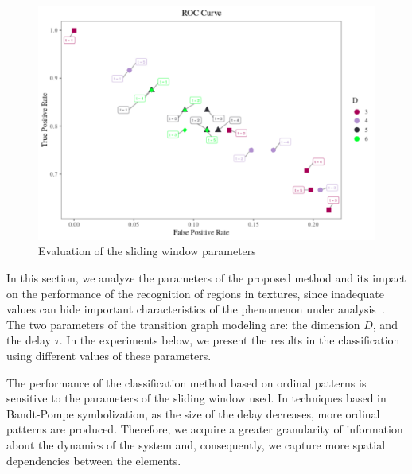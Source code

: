 \documentclass[journal]{IEEEtran}
\begin{document}
	\begin{figure}[h]
		\includegraphics[width=\columnwidth]{Figures/ROC.pdf}	\caption{Evaluation of the sliding window parameters}
		\label{fig:ROC}
	\end{figure} 
	
	In this section, we analyze the parameters of the proposed method and its impact on the performance of the recognition of regions in textures, since inadequate values can hide important characteristics of the phenomenon under analysis~\cite{mccullough2015time}.
	The two parameters of the transition graph modeling are: the dimension $D$, and the delay $\tau$.
	In the experiments below, we present the results in the classification using different values of these parameters.
	
	The performance of the classification method based on ordinal patterns is sensitive to the parameters of the sliding window used.
	In techniques based in Bandt-Pompe symbolization, as the size of the delay decreases, more ordinal patterns are produced.
	Therefore, we acquire a greater granularity of information about the dynamics of the system and, consequently, we capture more spatial dependencies between the elements.
	
\end{document}

